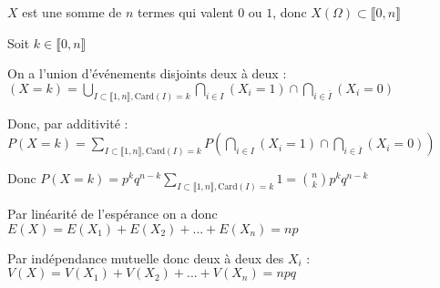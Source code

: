 \documentclass[a4paper,12pt]{book}
\newcommand{\Pre}[1]{\begin{tcolorbox}[sharp corners, colback=white,colframe=green!60!green!30!black!75, title=Preuve]#1\end{tcolorbox}}
\begin{document}
\Pre{$X$ est une somme de $n$ termes qui valent $0$ ou $1$, donc $X(\Omega)\subset \llbracket 0,n\rrbracket$
\par Soit $k\in\llbracket 0,n\rrbracket$
\par On a l'union d'événements disjoints deux à deux : $(X=k) =\bigcup_{I\subset \llbracket 1,n\rrbracket, \mathrm{Card}(I)=k} \bigcap_{i\in I}(X_i=1)\cap \bigcap_{i\in\overline{I}}(X_i=0)$
\par Donc, par additivité : $P(X=k) = \sum\limits_{I\subset \llbracket 1,n\rrbracket, \mathrm{Card}(I)=k}P\left(\bigcap_{i\in I}(X_i=1)\cap \bigcap_{i\in\overline{I}}(X_i=0)\right)$
\par Donc $P(X=k)=p^kq^{n-k} \sum\limits_{I\subset \llbracket 1,n\rrbracket, \mathrm{Card}(I)=k}1 = \binom{n}{k}p^kq^{n-k}$
\par Par linéarité de l'espérance on a donc $E(X) = E(X_1)+E(X_2)+...+E(X_n) = np$
\par Par indépendance mutuelle donc deux à deux des $X_i$ : $V(X) = V(X_1)+V(X_2)+...+V(X_n)=npq$}
\end{document}
